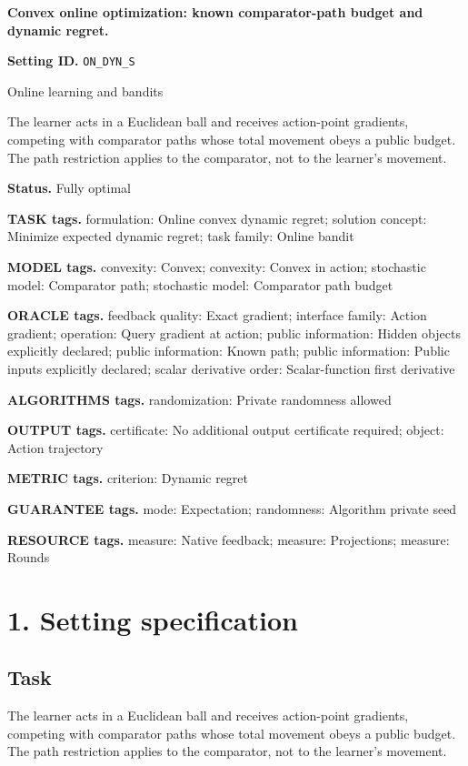 \documentclass[10pt,a4paper]{article}
\begin{document}
\raggedright

{\LARGE\bfseries\sffamily\color{AtlasNavy} Convex online optimization: known comparator-path budget and dynamic regret.\par}\vspace{5pt}
\textbf{Setting ID.} \texttt{ON\_\allowbreak{}DYN\_\allowbreak{}S}

Online learning and bandits

The learner acts in a Euclidean ball and receives action-point gradients, competing with comparator paths whose total movement obeys a public budget. The path restriction applies to the comparator, not to the learner's movement.

\textbf{Status.} Fully optimal

\textbf{TASK tags.} formulation: Online convex dynamic regret; solution concept: Minimize expected dynamic regret; task family: Online bandit

\textbf{MODEL tags.} convexity: Convex; convexity: Convex in action; stochastic model: Comparator path; stochastic model: Comparator path budget

\textbf{ORACLE tags.} feedback quality: Exact gradient; interface family: Action gradient; operation: Query gradient at action; public information: Hidden objects explicitly declared; public information: Known path; public information: Public inputs explicitly declared; scalar derivative order: Scalar-function first derivative

\textbf{ALGORITHMS tags.} randomization: Private randomness allowed

\textbf{OUTPUT tags.} certificate: No additional output certificate required; object: Action trajectory

\textbf{METRIC tags.} criterion: Dynamic regret

\textbf{GUARANTEE tags.} mode: Expectation; randomness: Algorithm private seed

\textbf{RESOURCE tags.} measure: Native feedback; measure: Projections; measure: Rounds

\section{1. Setting specification}
\subsection{Task}
The learner acts in a Euclidean ball and receives action-point gradients, competing with comparator paths whose total movement obeys a public budget. The path restriction applies to the comparator, not to the learner's movement.
\end{document}
